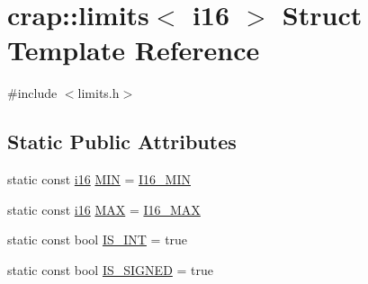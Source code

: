 \hypertarget{structcrap_1_1limits_3_01i16_01_4}{\section{crap\-:\-:limits$<$ i16 $>$ Struct Template Reference}
\label{structcrap_1_1limits_3_01i16_01_4}
}


{\ttfamily \#include $<$limits.\-h$>$}

\subsection*{Static Public Attributes}
\begin{DoxyCompactItemize}
\item 
static const \hyperlink{types_8h_ad309dbcaeea13aa602d686964156ea0b}{i16} \hyperlink{structcrap_1_1limits_3_01i16_01_4_aa889fd67d3f189c3088083ee7fcc864d}{M\-I\-N} = \hyperlink{types_8h_a72800ba3863b6bae70ee3f22482e6db3}{I16\-\_\-\-M\-I\-N}
\item 
static const \hyperlink{types_8h_ad309dbcaeea13aa602d686964156ea0b}{i16} \hyperlink{structcrap_1_1limits_3_01i16_01_4_a13ea6e73f00832ef4ee180905c515a50}{M\-A\-X} = \hyperlink{types_8h_a31c11a64ca799bf89552369a63cecf98}{I16\-\_\-\-M\-A\-X}
\item 
static const bool \hyperlink{structcrap_1_1limits_3_01i16_01_4_a9d0b16f84b3813fe161bcd5c4758750d}{I\-S\-\_\-\-I\-N\-T} = true
\item 
static const bool \hyperlink{structcrap_1_1limits_3_01i16_01_4_acaf692f3f9189b8439fda32001539b55}{I\-S\-\_\-\-S\-I\-G\-N\-E\-D} = true
\end{DoxyCompactItemize}


